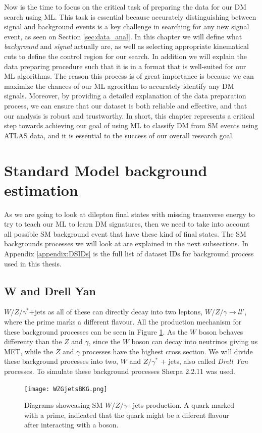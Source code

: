 \documentclass[14pt, a4paper]{book}
\begin{document}
Now is the time to focus on the critical task of preparing the data for our DM search using ML. This task is essential because accurately distinguishing between signal and background events is a key challenge in searching for any new signal event, 
as seen on Section \ref{sec:data_anal}. In this chapter we will define what \textit{background} and \textit{signal} actually are, as well as selecting appropriate kinematical cuts to define the control region for our search. In addition we will 
explain the data preparing procedure such that it is in a format that is well-suited for our ML algorithms. The reason this process is of great importance is because we can maximize the chances of our ML agrorithm to accurately identify any DM signals. 
Moreover, by providing a detailed explanation of the data preparation process, we can ensure that our dataset is both reliable and effective, and that our analysis is robust and trustworthy. In short, this chapter represents a critical step towards 
achieving our goal of using ML to classify DM from SM events using ATLAS data, and it is essential to the success of our overall research goal.



\clearpage
\section{Standard Model background estimation}
As we are going to look at dilepton final states with missing trasnverse energy to try to teach our ML to learn DM signatures, then we need to take into account all possible SM background event that have these kind of final states. The SM backgrounds processes we will look at are explained in the next subsections. 
In Appendix \ref{appendix:DSIDs} is the full list of dataset IDs for background process used in this thesis.

\subsection{W and Drell Yan}
$W/Z/\gamma^*$+jets as all of these can directly decay into two leptons, $W/Z/\gamma\rightarrow ll'$, where the prime marks a different flavour. All the production mechanism for these background processes can 
be seen in Figure \ref{fig:WZG_BKG}. As the $W$ boson behaves differenty than the $Z$ and $\gamma$, since the $W$ boson can decay into neutrinos giving us MET, while the $Z$ and $\gamma$ processes have the highest cross section. We will divide 
these background processes into two, $W$ and $Z/\gamma^*$ + jets, also called \textit{Drell Yan} processes. To simulate these background processes Sherpa 2.2.11 \cite{Sherpa} was used.
\graphicspath{{../../figures/}}
\begin{figure}[!ht]
    \centering
    \texttt{[image: WZGjetsBKG.png]}
    \caption[$W/Z/\gamma$+jets production]{Diagrams showcasing SM $W/Z/\gamma$+jets production. A quark marked with a prime, indicated that the quark might be a diferent flavour after interacting with a boson.}\label{fig:WZG_BKG}
\end{figure}
\end{document}
